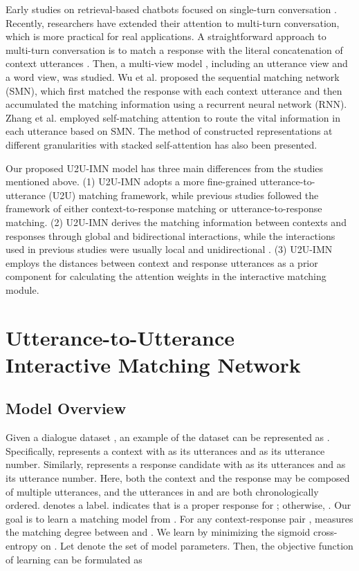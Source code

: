 \documentclass[journal]{IEEEtran}
\begin{document}
  Early studies on retrieval-based chatbots focused on single-turn conversation \cite{DBLP:conf/emnlp/WangLLC13,DBLP:journals/corr/JiLL14}.
  Recently, researchers have extended their attention to multi-turn conversation, which is more practical for real applications.
  A straightforward approach to multi-turn conversation is to match a response with the literal concatenation of context utterances \cite{DBLP:conf/sigdial/LowePSP15,DBLP:journals/corr/KadlecSK15,DBLP:journals/dad/LowePSCLP17}.
  Then, a multi-view model \cite{DBLP:conf/emnlp/ZhouDWZYTLY16}, including an utterance view and a word view, was studied.
  Wu et al. \cite{DBLP:conf/acl/WuWXZL17} proposed the sequential matching network (SMN), which first matched the response with each context utterance and then accumulated the matching information using a recurrent neural network (RNN). Zhang et al. \cite{DBLP:conf/coling/ZhangLZZL18} employed self-matching attention to route the vital information in each utterance based on SMN.
  The method of constructed representations at different granularities with stacked self-attention \cite{DBLP:conf/acl/WuLCZDYZL18} has also been presented.

  Our proposed U2U-IMN model has three main differences from the studies mentioned above.
  (1) U2U-IMN adopts a more fine-grained utterance-to-utterance (U2U) matching framework, while previous studies followed the framework of either context-to-response matching or utterance-to-response matching.
  (2) U2U-IMN derives the matching information between contexts and responses through global and bidirectional interactions, while
  the interactions used in previous studies were usually local and unidirectional \cite{DBLP:conf/acl/WuWXZL17}.
  (3) U2U-IMN employs the distances between context and response utterances as a prior component for calculating the attention weights in the interactive matching module.


\section{Utterance-to-Utterance \\ Interactive Matching Network}

  \subsection{Model Overview}
    Given a dialogue dataset , an example of the dataset can be represented as . Specifically,  represents a context with  as its utterances and  as its utterance number.
    Similarly,  represents a response candidate with  as its utterances and  as its utterance number.
    Here, both the context and the response may be composed of multiple utterances, and the utterances in  and  are both chronologically ordered.  denotes a label.  indicates that  is a proper response for ; otherwise, . Our goal is to learn a matching model  from . For any context-response pair ,  measures the matching degree between  and . We learn  by minimizing the sigmoid cross-entropy on . Let  denote the set of model parameters. Then, the objective function  of learning can be formulated as
    
\end{document}
